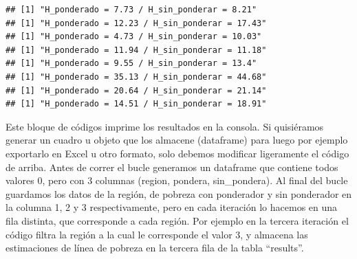 \documentclass[
]{book}
\begin{document}
\begin{verbatim}
## [1] "H_ponderado = 7.73 / H_sin_ponderar = 8.21"
## [1] "H_ponderado = 12.23 / H_sin_ponderar = 17.43"
## [1] "H_ponderado = 4.73 / H_sin_ponderar = 10.03"
## [1] "H_ponderado = 11.94 / H_sin_ponderar = 11.18"
## [1] "H_ponderado = 9.55 / H_sin_ponderar = 13.4"
## [1] "H_ponderado = 35.13 / H_sin_ponderar = 44.68"
## [1] "H_ponderado = 20.64 / H_sin_ponderar = 21.14"
## [1] "H_ponderado = 14.51 / H_sin_ponderar = 18.91"
\end{verbatim}

Este bloque de códigos imprime los resultados en la consola. Si quisiéramos generar un cuadro u objeto que los almacene (dataframe) para luego por ejemplo exportarlo en Excel u otro formato, solo debemos modificar ligeramente el código de arriba. Antes de correr el bucle generamos un dataframe que contiene todos valores 0, pero con 3 columnas (region, pondera, sin\_pondera). Al final del bucle guardamos los datos de la región, de pobreza con ponderador y sin ponderador en la columna 1, 2 y 3 respectivamente, pero en cada iteración lo hacemos en una fila distinta, que corresponde a cada región. Por ejemplo en la tercera iteración el código filtra la región a la cual le corresponde el valor 3, y almacena las estimaciones de línea de pobreza en la tercera fila de la tabla ``results''.
\end{document}
